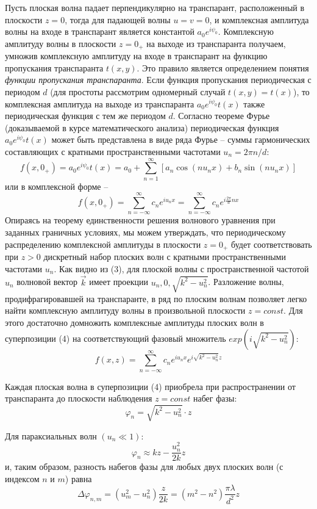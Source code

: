 \documentclass[14pt]{article}
\begin{document}
Пусть плоская волна падает перпендикулярно на транспарант, расположенный в плоскости
$z = 0$, тогда для падающей волны $u = v = 0$, и комплексная амплитуда волны на входе в транспарант
является константой $a_0e^{i\psi_0}$. Комплексную амплитуду волны в плоскости $z = 0_+$ на выходе из транспаранта получаем, умножив
комплексную амплитуду на входе в транспарант на функцию пропускания транспаранта $t(x,y)$. Это правило является определением
понятия \textsl{функции пропускания транспаранта}. Если функция пропускания периодическая с периодом $d$ (для простоты рассмотрим
одномерный случай $t(x,y) = t(x)$), то комплексная амплитуда на выходе из транспаранта $a_0e^{i\psi_0}t(x)$ также периодическая функция с тем
же периодом $d$. Согласно теореме Фурье (доказываемой в курсе математического анализа) периодическая функция
$a_0e^{i\psi_0}t(x)$ может быть представлена в виде ряда Фурье -- суммы гармонических составляющих с кратными пространственными частотами
$u_n = 2\pi n/d$:
$$
	f(x, 0_+) = a_0e^{i\psi_0}t(x) = a_0 + \sum_{n = 1}^\infty [a_n\cos(nu_nx) + b_n\sin(nu_nx)]
$$
\noindent или в комплексной форме --
\begin{equation}
	f(x, 0_+) = \sum_{n = -\infty}^\infty c_ne^{iu_nx} = \sum_{n = -\infty}^\infty c_ne^{i\frac{2\pi}{d}nx}
\end{equation}
\noindent Опираясь на теорему единственности решения волнового уравнения при заданных граничных условиях, мы можем утверждать,
что периодическому распределению комплексной амплитуды в плоскости $z = 0_+$ будет соответствовать при $z > 0$ дискретный набор
плоских волн с кратными пространственными частотами $u_n$. Как видно из (3), для плоской волны с пространственной частотой
$u_n$ волновой вектор $\vec{k}$ имеет проекции $u_n, 0, \sqrt{k^2 - u_n^2}$. Разложение волны, продифрагировавшей на транспаранте,
в ряд по плоским волнам позволяет легко найти комплексную амплитуду волны в произвольной плоскости $z = const$. Для этого достаточно домножить
комплексные амплитуды плоских волн в суперпозиции (4) на соответствующий фазовый множитель $exp(i\sqrt{k^2 - u_n^2})$:
\begin{equation}
	f(x,z) = \sum_{n = -\infty}^{\infty} c_ne^{iu_nx}e^{i\sqrt{k^2-u_n^2}z}
\end{equation}

Каждая плоская волна в суперпозиции (4) приобрела при распространении от транспаранта до плоскости наблюдения
$z = const$ набег фазы:
$$
	\varphi_n = \sqrt{k^2-u_n^2}\cdot z
$$

Для параксиальных волн $(u_n \ll 1)$:
\begin{equation}
	\varphi_n \approx kz - \frac{u_n^2}{2k}z
\end{equation}
\noindent и, таким образом, разность набегов фазы для любых двух плоских волн (с индексом $n$ и $m$) равна
\begin{equation}
	\Delta\varphi_{n,m} = (u_m^2 - u_n^2)\frac{z}{2k} = (m^2 - n^2)\frac{\pi\lambda}{d^2}z
\end{equation}
\end{document}
